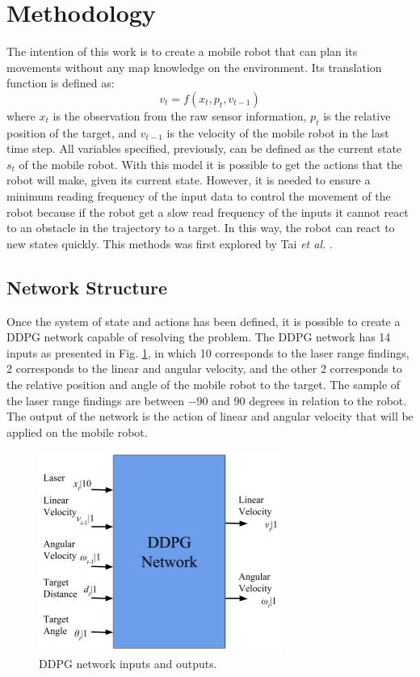 \section*{Methodology}

The intention of this work is to create a mobile robot that can plan its movements without any map knowledge on the environment. Its translation function is defined as:
\begin{equation}
v_t = f(x_t, p_t, v_{t-1})
\end{equation}
where $x_t$ is the observation from the raw sensor information, $p_t$ is the relative position of the target, and $v_{t-1}$ is the velocity of the mobile robot in the last time step.
All variables specified, previously, can be defined as the current state $s_t$ of the mobile robot.
With this model it is possible to get the actions that the robot will make, given its current state.
However, it is needed to ensure a minimum reading frequency of the input data to control the movement of the robot because if the robot get a slow read frequency of the inputs it cannot react to an obstacle in the trajectory to a target. In this way, the robot can react to new states quickly.
This methods was first explored by Tai \textit{et al.} \cite{tai2017virtual}.

\subsection*{Network Structure}

Once the system of state and actions has been defined, it is possible to create a DDPG network capable of resolving the problem.
The DDPG network has 14 inputs as presented in Fig. \ref{fig:entradaESaida}, in which 10 corresponds to the laser range findings, 2 corresponds to the linear and angular velocity, and the other 2 corresponds to the relative position and angle of the mobile robot to the target.
The sample of the laser range findings are between $-90$ and $90$ degrees in relation to the robot. The output of the network is the action of linear and angular velocity that will be applied on the mobile robot.

\begin{figure}[H]
\centerline{\includegraphics[width=8cm]{images/o_and_i.png}}
\caption{DDPG network inputs and outputs.}
\label{fig:entradaESaida}
\end{figure}

